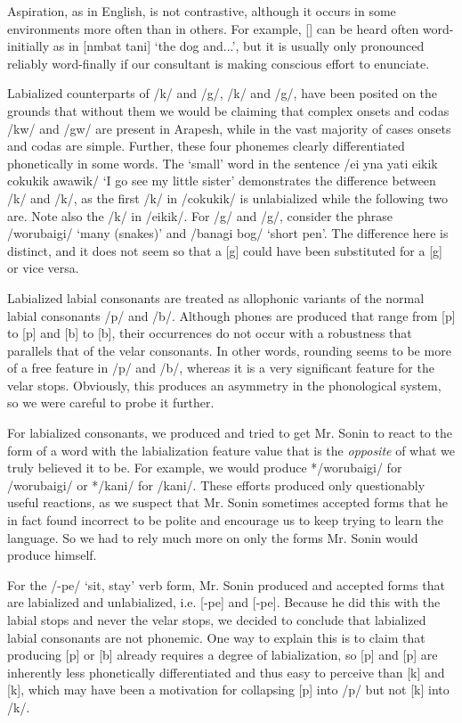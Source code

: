 \documentclass[pdftex,12pt,letterpaper]{article}
\let\ipa\textipa
\def\sw{\ipa{\super w}}
\begin{document}
 Aspiration, as in English, is not contrastive, although it occurs in some environments more often than in others. For example, [\ipa{t\super h}] can be heard often word-initially as in [n\ipa{1}mbat t\ipa{\super h}ani] `the dog and...', but it is usually only pronounced reliably word-finally if our consultant is making conscious effort to enunciate.
 
 Labialized counterparts of /k/ and /g/, /k\sw/ and /g\sw/, have been posited on the grounds that without them we would be claiming that complex onsets and codas /kw/ and /gw/ are present in Arapesh, while in the vast majority of cases onsets and codas are simple. Further, these four phonemes clearly differentiated phonetically in some words. The `small' word in the sentence /ei y\ipa{@}na yati eikik{\sw} cokuk\sw ik{\sw} awawik{\sw}/ `I go see my little sister' demonstrates the difference between /k/ and /k\sw/, as the first /k/ in /cokuk\sw ik\sw/ is unlabialized while the following two are. Note also the /k/ in /eikik\sw/. For /g/ and /g\sw/, consider the phrase /worubaig\sw i/ `many (snakes)' and /banagi bog/ `short pen'. The difference here is distinct, and it does not seem so that a [g\sw] could have been substituted for a [g] or vice versa.
 
 Labialized labial consonants are treated as allophonic variants of the normal labial consonants /p/ and /b/. Although phones are produced that range from [p] to [p\sw] and [b] to [b\sw], their occurrences do not occur with a robustness that parallels that of the velar consonants. In other words, rounding seems to be more of a free feature in /p/ and /b/, whereas it is a very significant feature for the velar stops. Obviously, this produces an asymmetry in the phonological system, so we were careful to probe it further.
 
 For labialized consonants, we produced and tried to get Mr. Sonin to react to the form of a word with the labialization feature value that is the \emph{opposite} of what we truly believed it to be. For example, we would produce */worubaigi/ for /worubaig\sw i/ or */kani/ for /k\sw ani/. These efforts produced only questionably useful reactions, as we suspect that Mr. Sonin sometimes accepted forms that he in fact found incorrect to be polite and encourage us to keep trying to learn the language. So we had to rely much more on only the forms Mr. Sonin would produce himself.
 
 For the /-pe/ `sit, stay' verb form, Mr. Sonin produced and accepted forms that are labialized and unlabialized, i.e. [-pe] and [-p\sw e]. Because he did this with the labial stops and never the velar stops, we decided to conclude that labialized labial consonants are not phonemic. One way to explain this is to claim that producing [p] or [b] already requires a degree of labialization, so [p] and [p\sw] are inherently less phonetically differentiated and thus easy to perceive than [k] and [k\sw], which may have been a motivation for collapsing [p\sw] into /p/ but not [k\sw] into /k/.
 
\end{document}
